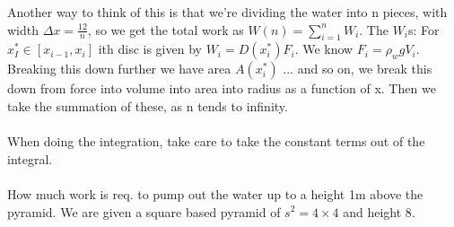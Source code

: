 \documentclass[twocolumn, 12pt]{report}
\begin{document}
Another way to think of this is that we're dividing the water into n pieces, with width $\Delta x = \frac{12}{n}$, so we get the total work as $W(n) = \sum_{i=1}^n W_i$. The $W_i$s: For $x_I^* \in [x_{i-1}, x_i]$ ith disc is given by $W_i = D(x_i^*)F_i$. We know $F_i = \rho_w g V_i$. Breaking this down further we have area $A(x_i^*)$ ... and so on, we break this down from force into volume into area into radius as a function of x. Then we take the summation of these, as n tends to infinity. \\\\ When doing the integration, take care to take the constant terms out of the integral. \\\\ How much work is req. to pump out the water up to a height 1m above the pyramid. We are given a square based pyramid of $s^2 = 4\times4$ and height 8.
\end{document}
